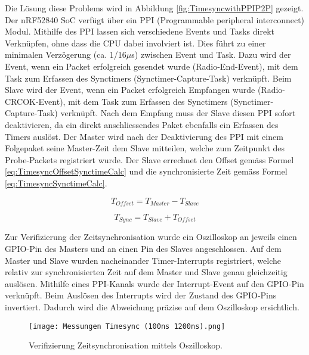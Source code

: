 Die Lösung diese Problems wird in Abbildung \ref{fig:TimesyncwithPPIP2P} gezeigt. Der nRF52840 SoC verfügt über ein PPI (Programmable peripheral interconnect) Modul.
Mithilfe des PPI lassen sich verschiedene Events und Tasks direkt Verknüpfen, ohne dass die CPU dabei involviert ist.
Dies führt zu einer minimalen Verzögerung (ca. 1/16$\mu$s) zwischen Event und Task.
Dazu wird der Event, wenn ein Packet erfolgreich gesendet wurde (Radio-End-Event), mit dem Task zum Erfassen des Synctimers (Synctimer-Capture-Task) verknüpft.
Beim Slave wird der Event, wenn ein Packet erfolgreich Empfangen wurde (Radio-CRCOK-Event), mit dem Task zum Erfassen des Synctimers (Synctimer-Capture-Task) verknüpft.
Nach dem Empfang muss der Slave diesen PPI sofort deaktivieren, da ein direkt anschliessendes Paket ebenfalls ein Erfassen des Timers auslöst.
Der Master wird nach der Deaktivierung des PPI mit einem Folgepaket seine Master-Zeit dem Slave mitteilen, welche zum Zeitpunkt des Probe-Packets registriert wurde. Der Slave errechnet den Offset gemäss Formel \ref{eq:TimesyncOffsetSynctimeCalc} und die synchronisierte Zeit gemäss Formel \ref{eq:TimesyncSynctimeCalc}. \cite{nordic_semi_nrf_infocenter_ppi_2020}

\begin{equation}\label{eq:TimesyncOffsetSynctimeCalc}
T_{Offset} =  T_{Master} - T_{Slave} 
\end{equation}

\begin{equation}\label{eq:TimesyncSynctimeCalc}
T_{Sync} =  T_{Slave} + T_{Offset} 
\end{equation}

Zur Verifizierung der Zeitsynchronisation wurde ein Oszilloskop an jeweils einen GPIO-Pin des Masters und an einen Pin des Slaves angeschlossen. Auf dem Master und Slave wurden nacheinander Timer-Interrupts registriert, welche relativ zur synchronisierten Zeit auf dem Master und Slave genau gleichzeitig auslösen. Mithilfe eines PPI-Kanals wurde der Interrupt-Event auf den GPIO-Pin verknüpft.
Beim Auslösen des Interrupts wird der Zustand des GPIO-Pins invertiert.
Dadurch wird die Abweichung präzise auf dem Oszilloskop ersichtlich.

\begin{figure} [H]
	\centering
	\texttt{[image: Messungen Timesync (100ns 1200ns).png]}
	\caption{Verifizierung Zeitsynchronisation mittels Oszilloskop.}
	\label{fig:TimesyncVerifikationP2P}
\end{figure}

